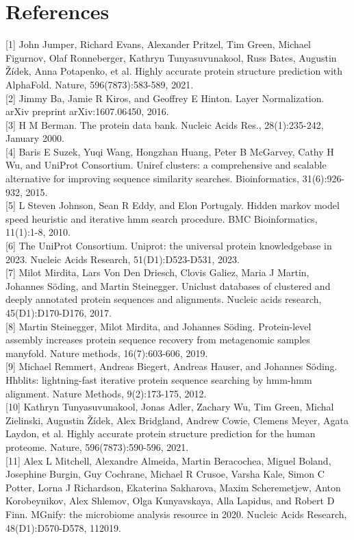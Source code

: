\documentclass[10pt]{article}
\begin{document}
\section*{References}
[1] John Jumper, Richard Evans, Alexander Pritzel, Tim Green, Michael Figurnov, Olaf Ronneberger, Kathryn Tunyasuvunakool, Russ Bates, Augustin Žídek, Anna Potapenko, et al. Highly accurate protein structure prediction with AlphaFold. Nature, 596(7873):583-589, 2021.\\[0pt]
[2] Jimmy Ba, Jamie R Kiros, and Geoffrey E Hinton. Layer Normalization. arXiv preprint arXiv:1607.06450, 2016.\\[0pt]
[3] H M Berman. The protein data bank. Nucleic Acids Res., 28(1):235-242, January 2000.\\[0pt]
[4] Baris E Suzek, Yuqi Wang, Hongzhan Huang, Peter B McGarvey, Cathy H Wu, and UniProt Consortium. Uniref clusters: a comprehensive and scalable alternative for improving sequence similarity searches. Bioinformatics, 31(6):926-932, 2015.\\[0pt]
[5] L Steven Johnson, Sean R Eddy, and Elon Portugaly. Hidden markov model speed heuristic and iterative hmm search procedure. BMC Bioinformatics, 11(1):1-8, 2010.\\[0pt]
[6] The UniProt Consortium. Uniprot: the universal protein knowledgebase in 2023. Nucleic Acids Research, 51(D1):D523-D531, 2023.\\[0pt]
[7] Milot Mirdita, Lars Von Den Driesch, Clovis Galiez, Maria J Martin, Johannes Söding, and Martin Steinegger. Uniclust databases of clustered and deeply annotated protein sequences and alignments. Nucleic acids research, 45(D1):D170-D176, 2017.\\[0pt]
[8] Martin Steinegger, Milot Mirdita, and Johannes Söding. Protein-level assembly increases protein sequence recovery from metagenomic samples manyfold. Nature methods, 16(7):603-606, 2019.\\[0pt]
[9] Michael Remmert, Andreas Biegert, Andreas Hauser, and Johannes Söding. Hhblits: lightning-fast iterative protein sequence searching by hmm-hmm alignment. Nature Methods, 9(2):173-175, 2012.\\[0pt]
[10] Kathryn Tunyasuvunakool, Jonas Adler, Zachary Wu, Tim Green, Michal Zielinski, Augustin Žídek, Alex Bridgland, Andrew Cowie, Clemens Meyer, Agata Laydon, et al. Highly accurate protein structure prediction for the human proteome. Nature, 596(7873):590-596, 2021.\\[0pt]
[11] Alex L Mitchell, Alexandre Almeida, Martin Beracochea, Miguel Boland, Josephine Burgin, Guy Cochrane, Michael R Crusoe, Varsha Kale, Simon C Potter, Lorna J Richardson, Ekaterina Sakharova, Maxim Scheremetjew, Anton Korobeynikov, Alex Shlemov, Olga Kunyavskaya, Alla Lapidus, and Robert D Finn. MGnify: the microbiome analysis resource in 2020. Nucleic Acids Research, 48(D1):D570-D578, 112019.\\[0pt]
\end{document}
